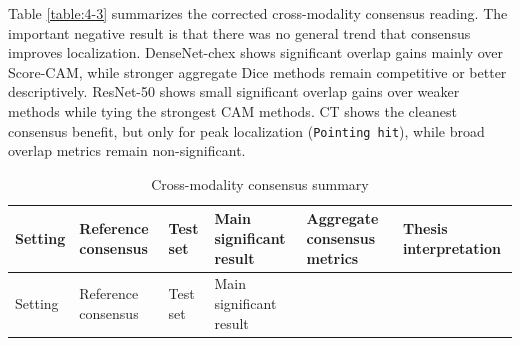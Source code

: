 Table \ref{table:4-3} summarizes the corrected cross-modality consensus reading. The
important negative result is that there was no general trend that
consensus improves localization. DenseNet-chex shows significant overlap
gains mainly over Score-CAM, while stronger aggregate Dice
methods remain competitive or better descriptively. ResNet-50 shows
small significant overlap gains over weaker methods while tying the
strongest CAM methods. CT shows the cleanest consensus benefit, but only
for peak localization (\texttt{Pointing \allowbreak hit}), while broad overlap
metrics remain non-significant.

\begin{longtable}[]{@{}llllll@{}}
	\caption{Cross-modality consensus summary}\tabularnewline
	\toprule
	\begin{minipage}[b]{0.14\columnwidth}\raggedright
		Setting\strut
	\end{minipage} & \begin{minipage}[b]{0.14\columnwidth}\raggedright
		Reference consensus\strut
	\end{minipage} & \begin{minipage}[b]{0.12\columnwidth}\raggedright
		Test set\strut
	\end{minipage} & \begin{minipage}[b]{0.14\columnwidth}\raggedright
		Main significant result\strut
	\end{minipage} & \begin{minipage}[b]{0.16\columnwidth}\raggedright
		Aggregate consensus metrics\strut
	\end{minipage} & \begin{minipage}[b]{0.14\columnwidth}\raggedright
		Thesis interpretation\strut
	\end{minipage}\tabularnewline
	\midrule
	\endfirsthead
	\toprule
	\begin{minipage}[b]{0.14\columnwidth}\raggedright
		Setting\strut
	\end{minipage} & \begin{minipage}[b]{0.14\columnwidth}\raggedright
		Reference consensus\strut
	\end{minipage} & \begin{minipage}[b]{0.12\columnwidth}\raggedright
		Test set\strut
	\end{minipage} & \begin{minipage}[b]{0.14\columnwidth}\raggedright
		Main significant result\strut
	\end{minipage} & \begin{minipage}[b]{0.16\columnwidth}\raggedright

\end{minipage}
\end{longtable}
